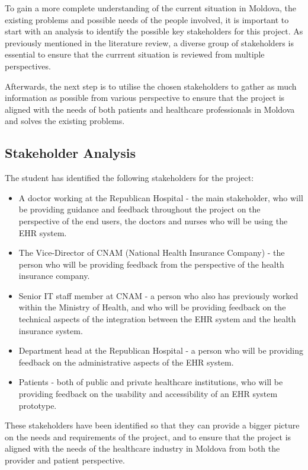 To gain a more complete understanding of the current situation in Moldova, the existing problems and possible needs of the people involved, it is important to start with an analysis to identify the possible key stakeholders for this project. As previously mentioned in the literature review, a diverse group of stakeholders is essential to ensure that the currrent situation is reviewed from multiple perspectives. 

Afterwards, the next step is to utilise the chosen stakeholders to gather as much information as possible from various perspective to ensure that the project is aligned with the needs of both patients and healthcare professionals in Moldova and solves the existing problems.

\subsection{Stakeholder Analysis}

The student has identified the following stakeholders for the project:

\begin{itemize}
    \item A doctor working at the Republican Hospital - the main stakeholder, who will be providing guidance and feedback throughout the project on the perspective of the end users, the doctors and nurses who will be using the EHR system.
    \item The Vice-Director of CNAM (National Health Insurance Company) - the person who will be providing feedback from the perspective of the health insurance company.
    \item Senior IT staff member at CNAM - a person who also has previously worked within the Ministry of Health, and who will be providing feedback on the technical aspects of the integration between the EHR system and the health insurance system.
    \item Department head at the Republican Hospital - a person who will be providing feedback on the administrative aspects of the EHR system.
    \item Patients - both of public and private healthcare institutions, who will be providing feedback on the usability and accessibility of an EHR system prototype.
\end{itemize}

These stakeholders have been identified so that they can provide a bigger picture on the needs and requirements of the project, and to ensure that the project is aligned with the needs of the healthcare industry in Moldova from both the provider and patient perspective. 

